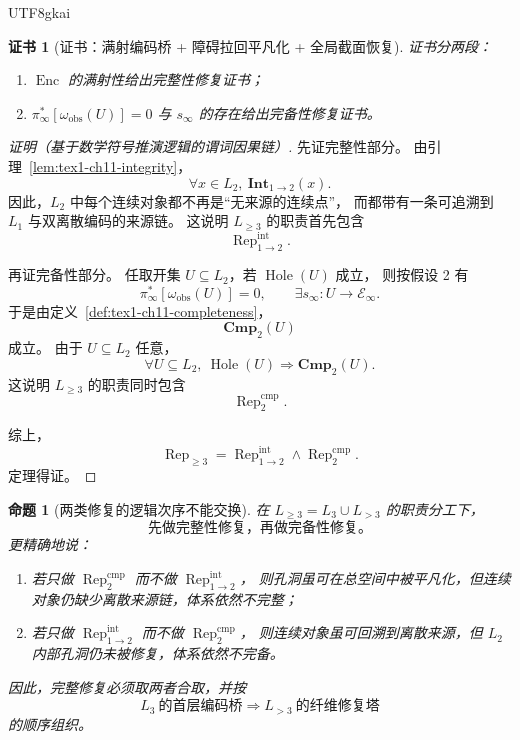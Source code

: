 \documentclass[12pt]{article}
\newtheorem{proposition}{命题}[section]
\newtheorem{Certificate}{证书}[section]
\newcommand{\Hole}{\operatorname{Hole}}
\begin{document}
\begin{CJK*}{UTF8}{gkai}
\begin{Certificate}[证书：满射编码桥 + 障碍拉回平凡化 + 全局截面恢复]
\label{cert:tex1-ch11-dual}
证书分两段：
\begin{enumerate}
  \item \(\operatorname{Enc}\) 的满射性给出完整性修复证书；
  \item \(\pi_\infty^\ast[\omega_{\mathrm{obs}}(U)]=0\) 与 \(s_\infty\) 的存在给出完备性修复证书。
\end{enumerate}
\end{Certificate}

\begin{proof}[证明（基于数学符号推演逻辑的谓词因果链）]
先证完整性部分。
由引理~\ref{lem:tex1-ch11-integrity}，
\[
  \forall x\in L_2,\ \mathbf{Int}_{1\to2}(x).
\]
因此，\(L_2\) 中每个连续对象都不再是“无来源的连续点”，
而都带有一条可追溯到 \(L_1\) 与双离散编码的来源链。
这说明 \(L_{\ge3}\) 的职责首先包含
\[
  \operatorname{Rep}^{\mathrm{int}}_{1\to2}.
\]

再证完备性部分。
任取开集 \(U\subseteq L_2\)，若 \(\Hole(U)\) 成立，
则按假设 2 有
\[
  \pi_\infty^\ast[\omega_{\mathrm{obs}}(U)]=0,
  \qquad
  \exists s_\infty:U\to\mathcal E_\infty.
\]
于是由定义~\ref{def:tex1-ch11-completeness}，
\[
  \mathbf{Cmp}_2(U)
\]
成立。
由于 \(U\subseteq L_2\) 任意，
\[
  \forall U\subseteq L_2,\ \Hole(U)\Rightarrow \mathbf{Cmp}_2(U).
\]
这说明 \(L_{\ge3}\) 的职责同时包含
\[
  \operatorname{Rep}^{\mathrm{cmp}}_2.
\]

综上，
\[
  \operatorname{Rep}_{\ge3}
  =
  \operatorname{Rep}^{\mathrm{int}}_{1\to2}
  \wedge
  \operatorname{Rep}^{\mathrm{cmp}}_2.
\]
定理得证。
\end{proof}

\begin{proposition}[两类修复的逻辑次序不能交换]
\label{prop:tex1-ch11-order}
在 \(L_{\ge3}=L_3\cup L_{>3}\) 的职责分工下，
\[
  \boxed{
    \text{先做完整性修复，再做完备性修复。}
  }
\]
更精确地说：
\begin{enumerate}
  \item 若只做 \(\operatorname{Rep}^{\mathrm{cmp}}_{2}\) 而不做 \(\operatorname{Rep}^{\mathrm{int}}_{1\to2}\)，
  则孔洞虽可在总空间中被平凡化，但连续对象仍缺少离散来源链，体系依然不完整；
  \item 若只做 \(\operatorname{Rep}^{\mathrm{int}}_{1\to2}\) 而不做 \(\operatorname{Rep}^{\mathrm{cmp}}_{2}\)，
  则连续对象虽可回溯到离散来源，但 \(L_2\) 内部孔洞仍未被修复，体系依然不完备。
\end{enumerate}
因此，完整修复必须取两者合取，并按
\[
  L_3\ \text{的首层编码桥}
  \Longrightarrow
  L_{>3}\ \text{的纤维修复塔}
\]
的顺序组织。
\end{proposition}


\end{CJK*}
\end{document}
